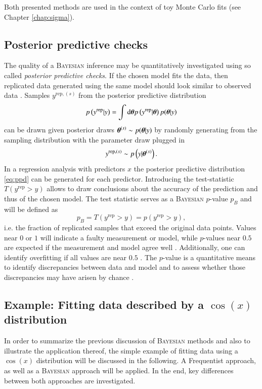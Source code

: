 Both presented methods are used in the context of toy Monte Carlo fits (see Chapter \ref{chap:sigma}). 
\subsection{Posterior predictive checks}
The quality of a \textsc{Bayesian} inference may be quantitatively investigated using so called \emph{posterior predictive checks}. If the chosen model fits the data, then replicated data generated using the same model should look similar to observed data \cite{bayes}. Samples $y^{\text{rep}, (s)}$ from the posterior predictive distribution
\begin{equation}
	p\left(y^\text{rep}|y\right)=\int\text{d}\boldsymbol{\theta} p\left(y^\text{rep}|\boldsymbol{\theta} \right)p(\boldsymbol{\theta}|y)
\end{equation}
can be drawn given posterior draws $\boldsymbol{\theta}^{(s)}\sim p(\boldsymbol{\theta}|y)$ by randomly generating from the sampling distribution with the parameter draw plugged in \cite{stan}
\begin{equation}
	\label{eq:ppd}
	y^{\text{rep}, (s)}\sim p\left(y|\boldsymbol{\theta}^{(s)}\right).
\end{equation}
In a regression analysis with predictors $x$ the posterior predictive distribution \eqref{eq:ppd} can be generated for each predictor. Introducing the test-statistic $T\left(y^\text{rep}>y\right)$ allows to draw conclusions about the accuracy of the prediction and thus of the chosen model. The test statistic serves as a \textsc{Bayesian} $p$-value $p_B$ \cite{bayes} and will be defined as \begin{equation}
	p_B=T\left(y^\text{rep}>y\right)=p(y^\text{rep}>y),
\end{equation}
i.e. the fraction of replicated samples that exceed the original data points. Values near $0$ or $1$ will indicate a faulty measurement or model, while $p$-values near $0.5$ are expected if the measurement and model agree well \cite{bayes}. Additionally, one can identify overfitting if all values are near $0.5$ \cite{bayes}. The $p$-value is a quantitative means to identify discrepancies between data and model and to assess whether those discrepancies may have arisen by chance \cite{bayes}.
\subsection{Example: Fitting data described by a $\cos(x)$ distribution}
In order to summarize the previous discussion of \textsc{Bayesian} methods and also to illustrate the application thereof, the simple example of fitting data using a $\cos(x)$ distribution will be discussed in the following. A Frequentist approach, as well as a \textsc{Bayesian} approach will be applied. In the end, key differences between both approaches are investigated.

